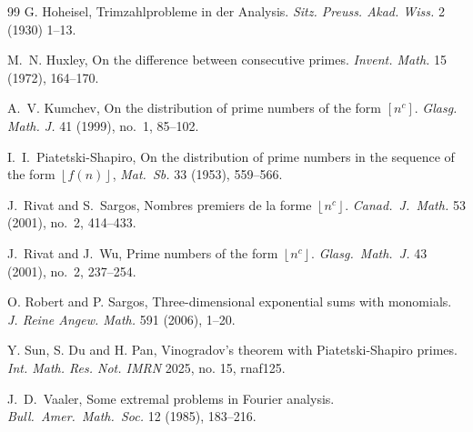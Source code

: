 \documentclass[12pt, reqno, twoside, letterpaper]{amsart}
\numberwithin{equation}{section}
\def\fl#1{\left\lfloor#1\right\rfloor}
\theoremstyle{customthm}
\theoremstyle{customrem}
\def\fl#1{\left\lfloor#1\right\rfloor}
\begin{document}
\begin{thebibliography}{99}
		G. Hoheisel, 
		Trimzahlprobleme in der Analysis. 
		\emph{Sitz. Preuss. Akad. Wiss.} 2 (1930) 1--13.


		
		M.~N. Huxley, 
		On the difference between consecutive primes. 
		\emph{Invent. Math.} 15 (1972), 164--170.
		
		A.~V. Kumchev, 
		On the distribution of prime numbers of the form $[n^c]$. 
		\emph{Glasg. Math. J.} 41 (1999), no.~1, 85--102.
		

		I.~I.~Piatetski-Shapiro, 
		On the distribution of prime numbers in the sequence of the form $\fl{f(n)}$,
		\emph{Mat.\ Sb.} 33 (1953), 559--566.
			
		J.~Rivat and S.~Sargos,
		Nombres premiers de la forme $\fl{n^c}$.
		\emph{Canad.\ J.\ Math.} 53 (2001), no.~2, 414--433.
		
		J.~Rivat and J.~Wu,
		Prime numbers of the form $\fl{n^c}$.
		\emph{Glasg.\ Math.\ J.} 43 (2001), no.~2, 237--254. 
		
		O. Robert and P. Sargos, 
		Three-dimensional exponential sums with monomials. 
		\emph{J. Reine Angew. Math.} 591 (2006), 1--20.
		
		Y. Sun, S. Du and H. Pan,
		Vinogradov's theorem with Piatetski-Shapiro primes.
		\emph{Int. Math. Res. Not. IMRN} 2025, no. 15, rnaf125.
		
		J.~D.~Vaaler,
		Some extremal problems in Fourier analysis. 
		\emph{Bull.\ Amer.\ Math.\ Soc.} 12 (1985), 183--216.
		


		
	\end{thebibliography}
	
\end{document}
